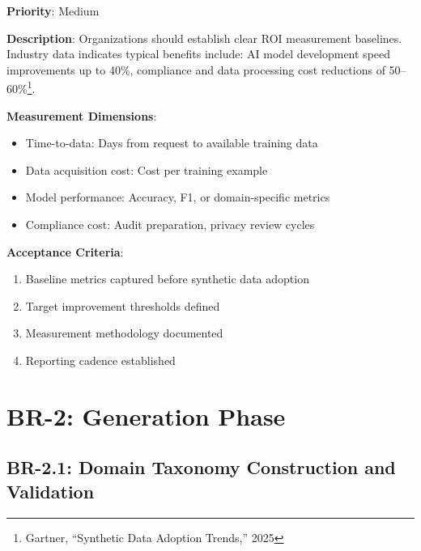 \documentclass[12pt,a4paper,twoside]{report}
\begin{document}
\begin{tcolorbox}[colback=blue!5,colframe=blue!70,title=BR-1.5: Investment Return Baseline]
\textbf{Priority}: Medium

\textbf{Description}: Organizations should establish clear ROI measurement
baselines. Industry data indicates typical benefits include: AI model development
speed improvements up to 40\%, compliance and data processing cost reductions
of 50--60\%\footnote{Gartner, ``Synthetic Data Adoption Trends,'' 2025}.

\textbf{Measurement Dimensions}:
\begin{itemize}
\item Time-to-data: Days from request to available training data
\item Data acquisition cost: Cost per training example
\item Model performance: Accuracy, F1, or domain-specific metrics
\item Compliance cost: Audit preparation, privacy review cycles
\end{itemize}

\textbf{Acceptance Criteria}:
\begin{enumerate}
\item Baseline metrics captured before synthetic data adoption
\item Target improvement thresholds defined
\item Measurement methodology documented
\item Reporting cadence established
\end{enumerate}
\end{tcolorbox}


\section{BR-2: Generation Phase}

\subsection{BR-2.1: Domain Taxonomy Construction and Validation}
\end{document}
